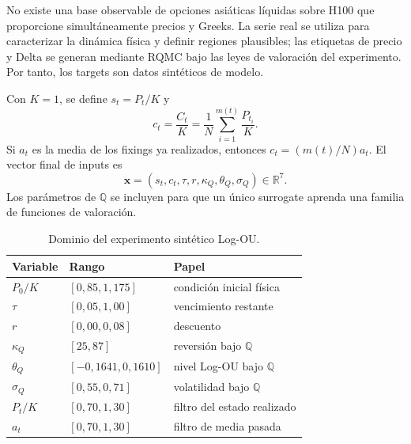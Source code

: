 No existe una base observable de opciones asiáticas líquidas sobre H100 que
proporcione simultáneamente precios y Greeks. La serie real se utiliza para
caracterizar la dinámica física y definir regiones plausibles; las etiquetas de
precio y Delta se generan mediante RQMC bajo las leyes de valoración del
experimento. Por tanto, los targets son datos sintéticos de modelo.

Con $K=1$, se define $s_t=P_t/K$ y
\begin{equation}
    c_t=\frac{C_t}{K}
    =\frac{1}{N}\sum_{i=1}^{m(t)}\frac{P_{t_i}}{K}.
\end{equation}
Si $a_t$ es la media de los fixings ya realizados, entonces
$c_t=(m(t)/N)a_t$. El vector final de inputs es
\begin{equation}
    \mathbf x=\left(s_t,c_t,\tau,r,\kappa_Q,\theta_Q,\sigma_Q\right)
    \in\mathbb R^7.
    \label{eq:final_ml_inputs}
\end{equation}
Los parámetros de $\mathbb Q$ se incluyen para que un único surrogate aprenda
una familia de funciones de valoración.

\begin{table}[htbp]
    \centering
    \caption{Dominio del experimento sintético Log-OU.}
    \label{tab:synthetic_domain}
    \begin{tabular}{lll}
        \toprule
        Variable & Rango & Papel \\
        \midrule
        $P_0/K$ & $[0{,}85,1{,}175]$ & condición inicial física \\
        $\tau$ & $[0{,}05,1{,}00]$ & vencimiento restante \\
        $r$ & $[0{,}00,0{,}08]$ & descuento \\
        $\kappa_Q$ & $[25,87]$ & reversión bajo $\mathbb Q$ \\
        $\theta_Q$ & $[-0{,}1641,0{,}1610]$ & nivel Log-OU bajo $\mathbb Q$ \\
        $\sigma_Q$ & $[0{,}55,0{,}71]$ & volatilidad bajo $\mathbb Q$ \\
        $P_t/K$ & $[0{,}70,1{,}30]$ & filtro del estado realizado \\
        $a_t$ & $[0{,}70,1{,}30]$ & filtro de media pasada \\
        \bottomrule
    \end{tabular}
\end{table}

